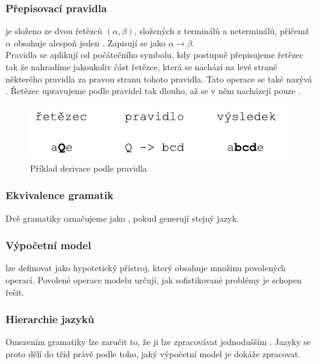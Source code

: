 \subsubsection*{Přepisovací pravidla}
\label{term:rewriteRule}

 je složeno ze dvou řetězců $(\alpha, \beta)$,
složených z terminálů a neterminálů, přičemž $\alpha$ obsahuje alespoň jeden .
Zapisují se jako $\alpha \rightarrow \beta$.\\
Pravidla se aplikují od počátečního symbolu, kdy postupně přepisujeme řetězec tak že nahradíme
jakoukoliv část řetězce, která se nachází na levé straně některého pravidla za pravou stranu tohoto pravidla.
Tato operace se také nazývá .
Řetězec upravujeme podle pravidel tak dlouho, až se v něm nacházejí pouze .

\begin{figure}[H]
  \centering
  \includegraphics{fig/rewriteRule.pdf}
  \caption{Příklad derivace podle pravidla}
  \label{img:rewriteRule}
\end{figure}

\subsubsection*{Ekvivalence gramatik}
Dvě gramatiky označujeme jako , pokud generují stejný jazyk.

\subsubsection*{Výpočetní model}

 lze definovat jako hypotetický přístroj,
který obsahuje množinu povolených operací. Povolené operace modelu určují,
jak sofistikované problémy je schopen řešit.

\subsubsection*{Hierarchie jazyků}
\label{subsec:chomHierarchy}

Omezením gramatiky lze zaručit to, že ji lze zpracovávat jednodušším
. Jazyky se proto
dělí do tříd právě podle toho, jaký výpočetní model je dokáže zpracovat.\\

